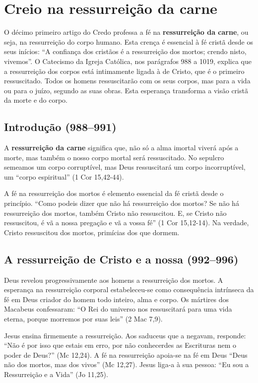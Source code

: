 \chapter{Creio na ressurreição da carne}

O décimo primeiro artigo do Credo professa a fé na \textbf{ressurreição da carne}, ou seja, na ressurreição do corpo humano. Esta crença é essencial à fé cristã desde os seus inícios: ``A confiança dos cristãos é a ressurreição dos mortos; crendo nisto, vivemos''. O Catecismo da Igreja Católica, nos parágrafos 988 a 1019, explica que a ressurreição dos corpos está intimamente ligada à de Cristo, que é o primeiro ressuscitado. Todos os homens ressuscitarão com os seus corpos, mas para a vida ou para o juízo, segundo as suas obras. Esta esperança transforma a visão cristã da morte e do corpo.

\section{Introdução (988--991)}

A \textbf{ressurreição da carne} significa que, não só a alma imortal viverá após a morte, mas também o nosso corpo mortal será ressuscitado. No sepulcro semeamos um corpo corruptível, mas Deus ressuscitará um corpo incorruptível, um ``corpo espiritual'' (1 Cor 15,42-44).

A fé na ressurreição dos mortos é elemento essencial da fé cristã desde o princípio. ``Como podeis dizer que não há ressurreição dos mortos? Se não há ressurreição dos mortos, também Cristo não ressuscitou. E, se Cristo não ressuscitou, é vã a nossa pregação e vã a vossa fé'' (1 Cor 15,12-14). Na verdade, Cristo ressuscitou dos mortos, primícias dos que dormem.

\section{A ressurreição de Cristo e a nossa (992--996)}

Deus revelou progressivamente aos homens a ressurreição dos mortos. A esperança na ressurreição corporal estabeleceu-se como consequência intrínseca da fé em Deus criador do homem todo inteiro, alma e corpo. Os mártires dos Macabeus confessaram: ``O Rei do universo nos ressuscitará para uma vida eterna, porque morremos por suas leis'' (2 Mac 7,9).

Jesus ensina firmemente a ressurreição. Aos saduceus que a negavam, responde: ``Não é por isso que estais em erro, por não conhecerdes as Escrituras nem o poder de Deus?'' (Mc 12,24). A fé na ressurreição apoia-se na fé em Deus ``Deus não dos mortos, mas dos vivos'' (Mc 12,27). Jesus liga-a à sua pessoa: ``Eu sou a Ressurreição e a Vida'' (Jo 11,25).

